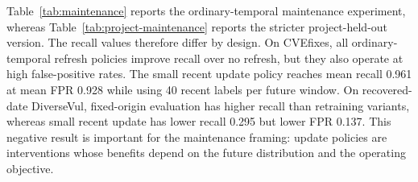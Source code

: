 \documentclass[a4paper,fleqn]{cas-dc}
\begin{document}
Table~\ref{tab:maintenance} reports the ordinary-temporal maintenance
experiment, whereas Table~\ref{tab:project-maintenance} reports the stricter
project-held-out version. The recall values therefore differ by design. On
CVEfixes, all ordinary-temporal refresh policies improve recall over no refresh,
but they also operate at high false-positive rates. The small recent update
policy reaches mean recall 0.961 at mean FPR 0.928 while using 40 recent labels
per future window. On recovered-date DiverseVul, fixed-origin evaluation has
higher recall than retraining variants, whereas small recent update has lower
recall 0.295 but lower FPR 0.137. This negative result is important for the
maintenance framing: update policies are interventions whose benefits depend on
the future distribution and the operating objective.

\begin{table}
\centering
\caption{Maintenance-policy summary for the selected primary baseline.}
\label{tab:maintenance}
\end{table}
\end{document}
